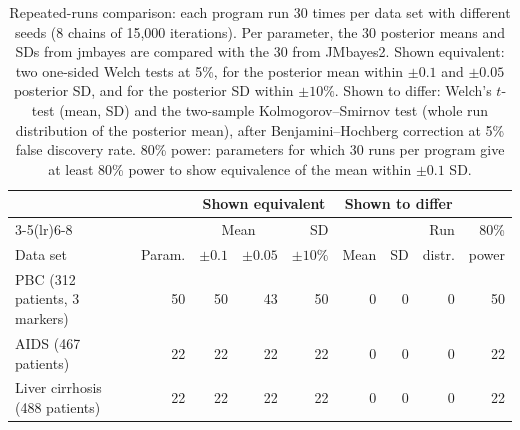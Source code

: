 \begin{table}[t]
\centering
\small
\caption{Repeated-runs comparison: each program run 30 times per data set with different seeds (8 chains of 15,000 iterations). Per parameter, the 30 posterior means and SDs from jmbayes are compared with the 30 from JMbayes2. Shown equivalent: two one-sided Welch tests at 5\%, for the posterior mean within $\pm 0.1$ and $\pm 0.05$ posterior SD, and for the posterior SD within $\pm 10\%$. Shown to differ: Welch's $t$-test (mean, SD) and the two-sample Kolmogorov--Smirnov test (whole run distribution of the posterior mean), after Benjamini--Hochberg correction at 5\% false discovery rate. 80\% power: parameters for which 30 runs per program give at least 80\% power to show equivalence of the mean within $\pm 0.1$ SD.}\label{tab:multi}
\vspace{4pt}
\begin{tabular}{lrrrrrrrr}
\toprule & & \multicolumn{3}{c}{Shown equivalent} & \multicolumn{3}{c}{Shown to differ} & \\
\cmidrule(lr){3-5}\cmidrule(lr){6-8}
& & \multicolumn{2}{c}{Mean} & SD & & & Run & 80\% \\
Data set & Param. & $\pm 0.1$ & $\pm 0.05$ & $\pm 10\%$ & Mean & SD & distr. & power \\ \midrule
PBC (312 patients, 3 markers) & 50 & 50 & 43 & 50 & 0 & 0 & 0 & 50 \\
AIDS (467 patients) & 22 & 22 & 22 & 22 & 0 & 0 & 0 & 22 \\
Liver cirrhosis (488 patients) & 22 & 22 & 22 & 22 & 0 & 0 & 0 & 22 \\
\bottomrule
\end{tabular}
\end{table}
